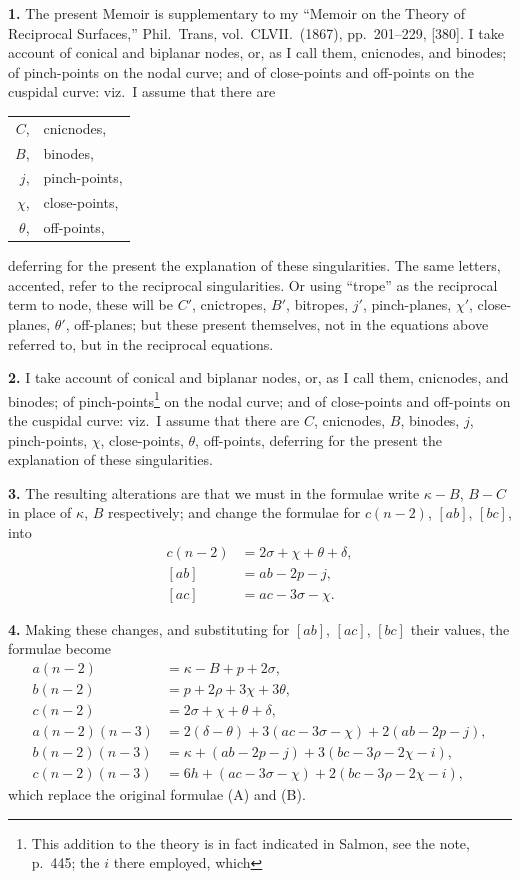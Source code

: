 \documentclass[11pt,a4paper]{article}
\begin{document}
\textbf{1.} The present Memoir is supplementary to my ``Memoir on the Theory of Reciprocal Surfaces,'' Phil.\ Trans, vol.~CLVII.\ (1867), pp.~201--229, [380]. I take account of conical and biplanar nodes, or, as I call them, cnicnodes, and binodes; of pinch-points on the nodal curve; and of close-points and off-points on the cuspidal curve: viz.\ I assume that there are
\begin{center}
\begin{tabular}{rl}
$C$, & cnicnodes, \\
$B$, & binodes, \\
$j$, & pinch-points, \\
$\chi$, & close-points, \\
$\theta$, & off-points,
\end{tabular}
\end{center}
deferring for the present the explanation of these singularities. The same letters, accented, refer to the reciprocal singularities. Or using ``trope'' as the reciprocal term to node, these will be $C'$, cnictropes, $B'$, bitropes, $j'$, pinch-planes, $\chi'$, close-planes, $\theta'$, off-planes; but these present themselves, not in the equations above referred to, but in the reciprocal equations.

\textbf{2.} I take account of conical and biplanar nodes, or, as I call them, cnicnodes, and binodes; of pinch-points\footnote{This addition to the theory is in fact indicated in Salmon, see the note, p.~445; the $i$ there employed, which} on the nodal curve; and of close-points and off-points on the cuspidal curve: viz.\ I assume that there are $C$, cnicnodes, $B$, binodes, $j$, pinch-points, $\chi$, close-points, $\theta$, off-points, deferring for the present the explanation of these singularities.

\textbf{3.} The resulting alterations are that we must in the formulae write $\kappa - B$, $B - C$ in place of $\kappa$, $B$ respectively; and change the formulae for $c(n-2)$, $[ab]$, $[bc]$, into
\begin{align*}
c(n-2) &= 2\sigma + \chi + \theta + \delta, \\
[ab] &= ab - 2p - j, \\
[ac] &= ac - 3\sigma - \chi.
\end{align*}

\textbf{4.} Making these changes, and substituting for $[ab]$, $[ac]$, $[bc]$ their values, the formulae become
\begin{align*}
a(n-2) &= \kappa - B + p + 2\sigma, \\
b(n-2) &= p + 2\rho + 3\chi + 3\theta, \\
c(n-2) &= 2\sigma + \chi + \theta + \delta, \\
a(n-2)(n-3) &= 2(\delta - \theta) + 3(ac - 3\sigma - \chi) + 2(ab - 2p - j), \\
b(n-2)(n-3) &= \kappa + (ab - 2p - j) + 3(bc - 3\rho - 2\chi - i), \\
c(n-2)(n-3) &= 6h + (ac - 3\sigma - \chi) + 2(bc - 3\rho - 2\chi - i),
\end{align*}
which replace the original formulae (A) and (B).
\end{document}
